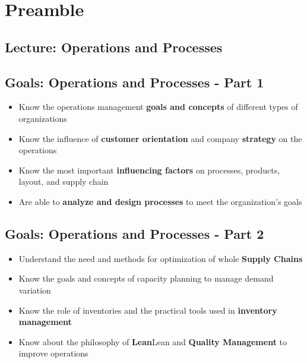 \section{Preamble}
\subsection{Lecture: Operations and Processes}
\subsection{Goals: Operations and Processes - Part 1}
\begin{itemize}
	\item Know the operations management \textbf{goals and
		concepts} of different types of organizations
	\item  Know the influence of \textbf{customer orientation}
	and company \textbf{strategy} on the operations 
	\item  Know the most important \textbf{influencing factors}
	on processes, products, layout, and supply
	chain
	\item  Are able to \textbf{analyze and design processes} to
	meet the organization's goals
\end{itemize}

\subsection{Goals: Operations and Processes - Part 2}
\begin{itemize}
	\item Understand the need and methods for
	optimization of whole \textbf{Supply Chains}
	\item Know the goals and concepts of capacity
	planning to manage demand variation
	\item Know the role of inventories and the practical
	tools used in \textbf{inventory management}
	\item Know about the philosophy of \textbf{Lean}Lean and
	\textbf{Quality Management} to improve operations
\end{itemize}